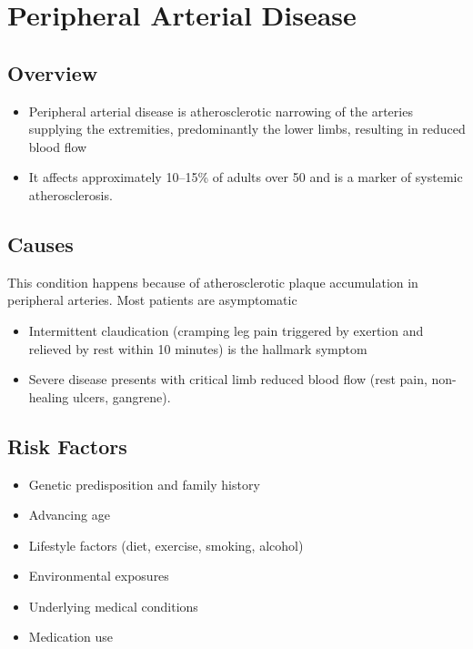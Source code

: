 \chapter{Peripheral Arterial Disease}
\label{sec:Peripheral Arterial Disease}

\section{Overview}


\begin{itemize}[noitemsep]
  \item Peripheral arterial disease is atherosclerotic narrowing of the arteries supplying the extremities, predominantly the lower limbs, resulting in reduced blood flow
  \item It affects approximately 10--15\% of adults over 50 and is a marker of systemic atherosclerosis.
\end{itemize}
\section{Causes}
This condition happens because of atherosclerotic plaque accumulation in peripheral arteries. Most patients are asymptomatic

\begin{itemize}[noitemsep]
  \item Intermittent claudication (cramping leg pain triggered by exertion and relieved by rest within 10 minutes) is the hallmark symptom
  \item Severe disease presents with critical limb reduced blood flow (rest pain, non-healing ulcers, gangrene).
\end{itemize}
\section{Risk Factors}


\begin{itemize}[noitemsep]
  \item Genetic predisposition and family history
  \item Advancing age
  \item Lifestyle factors (diet, exercise, smoking, alcohol)
  \item Environmental exposures
  \item Underlying medical conditions
  \item Medication use
\end{itemize}
